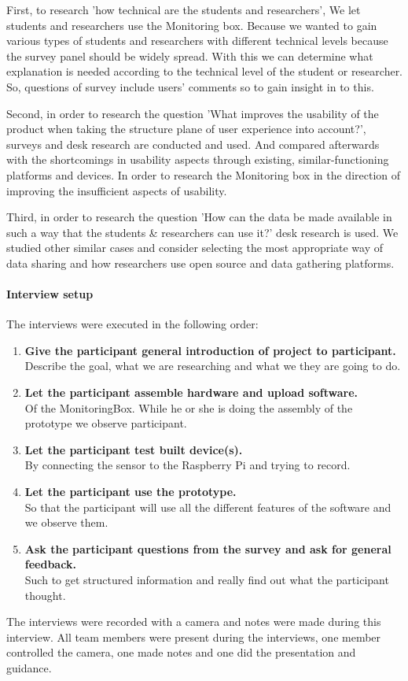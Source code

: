\documentclass[conference]{IEEEtran}
\begin{document}
			First, to research 'how technical are the students and researchers', We let students and researchers  use the Monitoring box. Because we wanted to gain various types of students and researchers with different technical levels because the survey panel should be widely spread. With this we can determine what explanation is needed according to the technical level of the student or researcher. So, questions of survey include users' comments so to gain insight in to this. 

			Second, in order to research the question 'What improves the usability of the product when taking the structure plane of user experience into account?', surveys and desk research are conducted and used. And compared afterwards with the shortcomings in usability aspects through existing, similar-functioning platforms and devices. In order to research the Monitoring box in the direction of improving the insufficient aspects of usability.

			Third, in order to research the question 'How can the data be made available in such a way that the students \& researchers can use it?' desk research is used. We studied other similar cases and consider selecting the most appropriate way of data sharing and how researchers use open source and data gathering platforms.
		\paragraph{Interview setup} The interviews were executed in the following order:
			\begin{enumerate}
				\item \textbf{Give the participant general introduction of project to participant.} \\
				Describe the goal, what we are researching and what we they are going to do.
				\item \textbf{Let the participant assemble hardware and upload software.}\\
				Of the MonitoringBox. While he or she is doing the assembly of the prototype we observe participant.
				\item \textbf{Let the participant test built device(s).}\\
				By connecting the sensor to the Raspberry Pi and trying to record.
				\item \textbf{Let the participant use the prototype.}\\
				So that the participant will use all the different features of the software and we observe them.
				\item \textbf{Ask the participant questions from the survey and ask for general feedback.}\\
				Such to get structured information and really find out what the participant thought.
			\end{enumerate}
			The interviews were recorded with a camera and notes were made during this interview. All team members were present during the interviews, one member controlled the camera, one made notes and one did the presentation and guidance.
\end{document}
